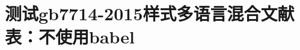 \documentclass[twoside]{article}
\begin{document}
    \section{测试gb7714-2015样式多语言混合文献表：不使用babel}

	\nocite{*}

    \printbibliography

    
\end{document}
